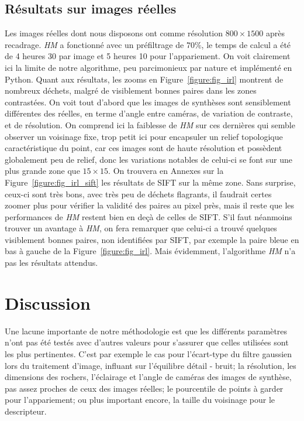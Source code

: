 \documentclass[
	a4paper, %
	10pt, %
	unnumberedsections, %
	twoside, %
]{LTJournalArticle}
\begin{document}
\subsection{Résultats sur images réelles}
Les images réelles dont nous disposons ont comme résolution $800 \times 1500$ après recadrage. \textit{HM} a fonctionné
avec un préfiltrage de $70 \%$, le temps de calcul a été de 4 heures 30 par image et 5 heures 10 pour l'appariement.
On voit clairement ici la limite de notre algorithme, peu parcimonieux par nature et implémenté en Python.
Quant aux résultats, les zooms en Figure~\ref{figure:fig_irl} montrent de nombreux déchets, malgré de visiblement
bonnes paires dans les zones contrastées.
On voit tout d'abord que les images de synthèses sont sensiblement différentes des réelles,
en terme d'angle entre caméras, de variation de contraste, et de résolution.
On comprend ici la faiblesse de \textit{HM} sur ces dernières qui semble observer un voisinage fixe,
trop petit ici pour encapsuler un relief topologique caractéristique du point,
car ces images sont de haute résolution et possèdent globalement peu de relief, donc les
variations notables de celui-ci se font sur une plus grande zone que $15 \times 15$.
On trouvera en Annexes sur la Figure~\ref{figure:fig_irl_sift} les résultats de SIFT sur la même zone.
Sans surprise, ceux-ci sont très bons, avec très peu de déchets flagrants, il faudrait certes zoomer plus
pour vérifier la validité des paires au pixel près, mais il reste que les performances de \textit{HM}
restent bien en deçà de celles de SIFT. S'il faut néanmoins trouver un avantage à \textit{HM}, on fera
remarquer que celui-ci a trouvé quelques visiblement bonnes paires, non identifiées par SIFT, par
exemple la paire bleue en bas à gauche de la Figure~\ref{figure:fig_irl}.
Mais évidemment, l'algorithme \textit{HM} n'a pas les résultats attendus.



\section{Discussion}

Une lacune importante de notre méthodologie est que les différents paramètres
n'ont pas été testés avec d'autres valeurs pour s'assurer que celles
utilisées sont les plus pertinentes.
C'est par exemple le cas pour l'écart-type du filtre gaussien
lors du traitement d'image, influant sur l'équilibre détail - bruit;
la résolution, les dimensions des rochers, l'éclairage et l'angle de caméras des images de synthèse,
pas assez proches de ceux des images réelles;
le pourcentile de points à garder pour l'appariement;
ou plus important encore, la taille du voisinage pour le descripteur.\\
\end{document}

